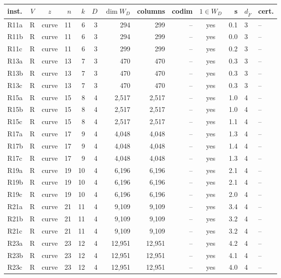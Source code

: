 \begin{tabular}{@{}lccrrrrrrcrll@{}}
\toprule
inst. & $V$ & $z$ & $n$ & $k$ & $D$ & $\dim W_D$ & columns & codim & $1\in W_D$ & s & $d_{\tilde F}$ & cert. \\
\midrule
R11a & R & curve & 11 & 6 & 3 & 294 & 299 & -- & yes & 0.1 & 3 & -- \\
R11b & R & curve & 11 & 6 & 3 & 294 & 299 & -- & yes & 0.0 & 3 & -- \\
R11c & R & curve & 11 & 6 & 3 & 299 & 299 & -- & yes & 0.2 & 3 & -- \\
R13a & R & curve & 13 & 7 & 3 & 470 & 470 & -- & yes & 0.3 & 3 & -- \\
R13b & R & curve & 13 & 7 & 3 & 470 & 470 & -- & yes & 0.3 & 3 & -- \\
R13c & R & curve & 13 & 7 & 3 & 470 & 470 & -- & yes & 0.3 & 3 & -- \\
R15a & R & curve & 15 & 8 & 4 & 2{,}517 & 2{,}517 & -- & yes & 1.0 & 4 & -- \\
R15b & R & curve & 15 & 8 & 4 & 2{,}517 & 2{,}517 & -- & yes & 1.0 & 4 & -- \\
R15c & R & curve & 15 & 8 & 4 & 2{,}517 & 2{,}517 & -- & yes & 1.1 & 4 & -- \\
R17a & R & curve & 17 & 9 & 4 & 4{,}048 & 4{,}048 & -- & yes & 1.3 & 4 & -- \\
R17b & R & curve & 17 & 9 & 4 & 4{,}048 & 4{,}048 & -- & yes & 1.4 & 4 & -- \\
R17c & R & curve & 17 & 9 & 4 & 4{,}048 & 4{,}048 & -- & yes & 1.3 & 4 & -- \\
R19a & R & curve & 19 & 10 & 4 & 6{,}196 & 6{,}196 & -- & yes & 2.1 & 4 & -- \\
R19b & R & curve & 19 & 10 & 4 & 6{,}196 & 6{,}196 & -- & yes & 2.1 & 4 & -- \\
R19c & R & curve & 19 & 10 & 4 & 6{,}196 & 6{,}196 & -- & yes & 2.0 & 4 & -- \\
R21a & R & curve & 21 & 11 & 4 & 9{,}109 & 9{,}109 & -- & yes & 3.4 & 4 & -- \\
R21b & R & curve & 21 & 11 & 4 & 9{,}109 & 9{,}109 & -- & yes & 3.2 & 4 & -- \\
R21c & R & curve & 21 & 11 & 4 & 9{,}109 & 9{,}109 & -- & yes & 3.2 & 4 & -- \\
R23a & R & curve & 23 & 12 & 4 & 12{,}951 & 12{,}951 & -- & yes & 4.2 & 4 & -- \\
R23b & R & curve & 23 & 12 & 4 & 12{,}951 & 12{,}951 & -- & yes & 4.1 & 4 & -- \\
R23c & R & curve & 23 & 12 & 4 & 12{,}951 & 12{,}951 & -- & yes & 4.0 & 4 & -- \\

\end{tabular}
